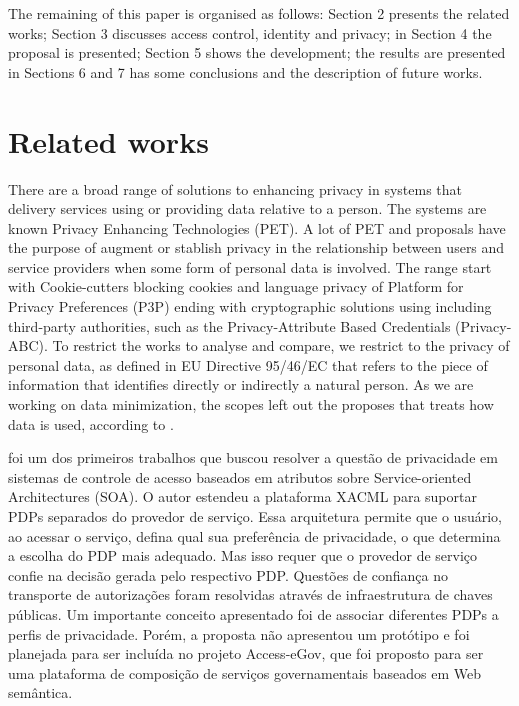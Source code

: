 \documentclass{doublecol-new}
\begin{document}
The remaining of this paper is organised as follows: Section 2 presents the related works; Section 3 discusses access control, identity and privacy; in Section 4 the proposal is presented; Section 5 shows the development; the results are presented in Sections 6 and 7 has some conclusions and the description of future works.

\section{Related works}
There are a broad range of solutions to enhancing privacy in systems that delivery services using or providing data relative to a person. The systems are known Privacy Enhancing Technologies (PET). A lot of PET and proposals have the purpose of augment or stablish privacy in the relationship between users and service providers when some form of personal data is involved. The range start with Cookie-cutters blocking cookies and language privacy of Platform for Privacy Preferences (P3P) ending with cryptographic solutions using including third-party authorities, such as the Privacy-Attribute Based Credentials (Privacy-ABC). To restrict the works to analyse and compare, we restrict to the privacy of personal data, as defined in EU Directive 95/46/EC\cite{directive199595} that refers to the piece of information that identifies directly or indirectly a natural person. As we are working on data minimization, the scopes left out the proposes that treats how data is used, according to \citep{mondal2014beyond}.

\citep{kolter2007privacy} foi um dos primeiros trabalhos que buscou resolver a questão de privacidade em sistemas de controle de acesso baseados em atributos sobre Service-oriented Architectures (SOA). O autor estendeu a plataforma XACML para suportar PDPs separados do provedor de serviço. Essa arquitetura permite que o usuário, ao acessar o serviço, defina qual sua preferência de privacidade, o que determina a escolha do PDP mais adequado. Mas isso requer que o provedor de serviço confie na decisão gerada pelo respectivo PDP. Questões de confiança no transporte de autorizações foram resolvidas através de infraestrutura de chaves públicas. Um importante conceito apresentado foi de associar diferentes PDPs a perfis de privacidade. Porém, a proposta não apresentou um protótipo e foi planejada para ser incluída no projeto Access-eGov\cite{pernulAccesseGov}, que foi proposto para ser uma plataforma de composição de serviços governamentais baseados em Web semântica.
\end{document}

